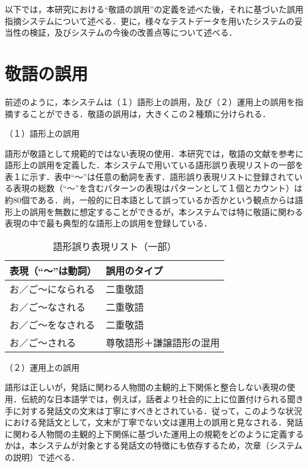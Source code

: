 \bigskip

以下では，本研究における``敬語の誤用''の定義を述べた後，それに基づいた誤用指摘システムについて述べる．更に，様々なテストデータを用いたシステムの妥当性の検証，及びシステムの今後の改善点等について述べる．

\section{敬語の誤用}
前述のように，本システムは（１）語形上の誤用，及び（２）運用上の誤用を指摘することができる．敬語の誤用は，大きくこの２種類に分けられる．

（１）語形上の誤用

語形が敬語として規範的ではない表現の使用．本研究では，敬語の文献\cite[等]{Kikuchi1996,Kikuchi1997,Horikawa1969,Miyaji1999}を参考に語形上の誤用を定義した．本システムで用いている語形誤り表現リストの一部を表１に示す．表中``〜''は任意の動詞を表す．語形誤り表現リストに登録されている表現の総数（``〜''を含むパターンの表現はパターンとして１個とカウント）は約80個である．尚，一般的に日本語として誤っているか否かという観点からは語形上の誤用を無数に想定することができるが，本システムでは特に敬語に関わる表現の中で最も典型的な語形上の誤用を登録している．


\begin{table}[htbp]
\begin{center} 
\caption{語形誤り表現リスト（一部）} 
\label{tbl:table1} 
\begin{tabular}{ll} 
\hline 
\multicolumn{1}{c}{表現（``〜''は動詞）} & \multicolumn{1}{l}{誤用のタイプ} \\ 
\hline
お／ご〜になられる&二重敬語\\
お／ご〜なされる&二重敬語\\
お／ご〜をなされる&二重敬語\\
お／ご〜される&尊敬語形＋謙譲語形の混用\\
\hline 
\end{tabular} 
\end{center} 
\end{table} 

（２）運用上の誤用

語形は正しいが，発話に関わる人物間の主観的上下関係と整合しない表現の使用．伝統的な日本語学では，例えば，話者より社会的に上に位置付けられる聞き手に対する発話文の文末は丁寧にすべきとされている．従って，このような状況における発話文として，文末が丁寧でない文は運用上の誤用と見なされる．発話に関わる人物間の主観的上下関係に基づいた運用上の規範をどのように定義するかは，本システムが対象とする発話文の特徴にも依存するため，次章（システムの説明）で述べる．

